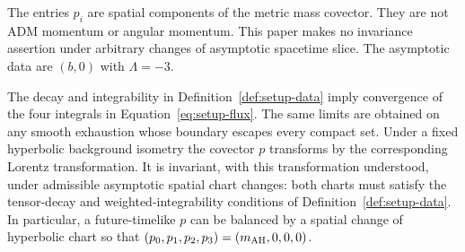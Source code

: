 The entries $p_i$ are spatial components of the metric mass covector.
They are not ADM momentum or angular momentum. This paper makes no
invariance assertion under arbitrary changes of asymptotic spacetime
slice. The asymptotic data are $(b,0)$ with $\Lambda=-3$.

\begin{lemma}\label{lem:setup-mass-covariance}
The decay and integrability in Definition~\ref{def:setup-data} imply
convergence of the four integrals in Equation~\ref{eq:setup-flux}.
The same limits are obtained on any smooth exhaustion whose boundary
escapes every compact set. Under a fixed hyperbolic background isometry
the covector $p$ transforms by the corresponding Lorentz transformation.
It is invariant, with this transformation understood, under admissible
asymptotic spatial chart changes: both charts must satisfy the
tensor-decay and weighted-integrability conditions of
Definition~\ref{def:setup-data}. In particular, a future-timelike $p$
can be balanced by a spatial change of hyperbolic chart so that
$(p_0,p_1,p_2,p_3)=(m_{\mathrm{AH}},0,0,0)$.
\end{lemma}

